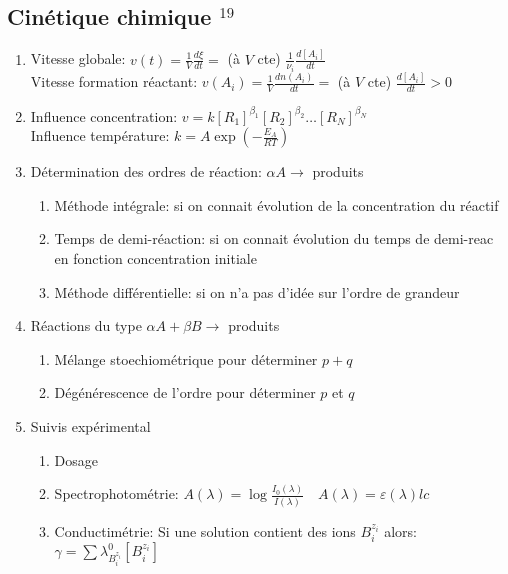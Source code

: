 \documentclass[fleqn]{article}
\theoremstyle{definition} \newtheorem*{defi}{D\'efinition}
\theoremstyle{definition} \newtheorem*{theo}{Th\'eor\`eme}
\theoremstyle{definition} \newtheorem*{coro}{Corollaire}
\theoremstyle{remark} \newtheorem*{rqs}{Remarques}
\theoremstyle{definition} \newtheorem*{prop}{Propri\'et\'e}
\begin{document}
\subsection{Cin\'etique chimique $^{19}$}
\begin{enumerate}
	\item Vitesse globale: $v(t) = \frac{1}{V} \frac{d \xi}{dt} = $ (\`a $V$ cte) $\frac{1}{\nu_i} \frac{d[A_i]}{dt}$ \\
		Vitesse formation r\'eactant: $v(A_i) = \frac{1}{V} \frac{d n(A_i)}{dt} = $ (\`a $V$ cte) $\frac{d[A_i]}{dt} > 0$
	\item Influence concentration: $v = k[R_1]^{\beta_1} [R_2]^{\beta_2} \hdots [R_N]^{\beta_N}$\\
		Influence temp\'erature: $k = A \exp (-\frac{E_A}{RT})$
	\item D\'etermination des ordres de r\'eaction: $\alpha A \rightarrow$ produits
	\begin{enumerate}
		\item M\'ethode int\'egrale: si on connait \'evolution de la concentration du r\'eactif
		\item Temps de demi-r\'eaction: si on connait \'evolution du temps de demi-reac en fonction concentration initiale
		\item M\'ethode diff\'erentielle: si on n'a pas d'id\'ee sur l'ordre de grandeur
	\end{enumerate}
	\item R\'eactions du type $\alpha A + \beta B \rightarrow $ produits
	\begin{enumerate}
		\item M\'elange stoechiom\'etrique pour d\'eterminer $p+q$
		\item D\'eg\'en\'erescence de l'ordre pour d\'eterminer $p$ et $q$
	\end{enumerate}
	\item Suivis exp\'erimental
		\begin{enumerate}
			\item Dosage
			\item Spectrophotom\'etrie: $A(\lambda) = \log \frac{I_0(\lambda)}{I(\lambda)} \quad A(\lambda) = \varepsilon(\lambda) l c$
			\item Conductim\'etrie: Si une solution contient des ions $B_i^{z_i}$ alors: \\ $\gamma = \sum \lambda_{B_i^{z_i}}^0[B_i^{z_i}]$
		\end{enumerate}
\end{enumerate}
\end{document}
